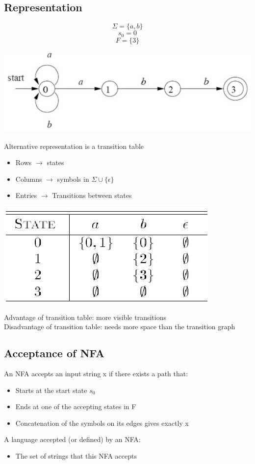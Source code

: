 \documentclass{article}[18pt]
\begin{document}
\subsection{Representation}
$$\Sigma = \{a,b\}$$
$$s_0=0$$
$$F=\{3\}$$
\begin{center}
	\includegraphics[scale=0.7]{NFA}
\end{center}
Alternative representation is a transition table
\begin{itemize}
	\item Rows $\rightarrow$ states
	\item Columns $\rightarrow$ symbols in $\Sigma \cup \{\epsilon\}$
	\item Entries $\rightarrow$ Transitions between states
\end{itemize}
\begin{center}
	\includegraphics[scale=0.7]{NFA1}
\end{center}
Advantage of transition table: more visible transitions\\
Disadvantage of transition table: needs more space than the transition graph
\subsection{Acceptance of NFA}
An NFA accepts an input string x if there exists a path that:
\begin{itemize}
	\item Starts at the start state $s_0$
	\item Ends at one of the accepting states in F
	\item Concatenation of the symbols on its edges gives exactly x
\end{itemize}
A language accepted (or defined) by an NFA:
\begin{itemize}
	\item The set of strings that this NFA accepts
\end{itemize}
\end{document}
